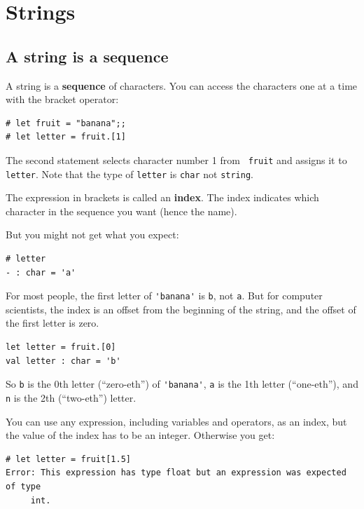 \documentclass[10pt]{book}
\begin{document}
\chapter{Strings}
\label{strings}


\section{A string is a sequence}

A string is a {\bf sequence} of characters.  
You can access the characters one at a time with the
bracket operator:

\beforeverb
\begin{verbatim}
# let fruit = "banana";;
# let letter = fruit.[1]
\end{verbatim}
\afterverb
%
The second statement selects character number 1 from {\tt
fruit} and assigns it to {\tt letter}. Note that the type 
of {\tt letter} is {\tt char} not {\tt string}.


The expression in brackets is called an {\bf index}.  
The index indicates which character in the sequence you
want (hence the name).

But you might not get what you expect:

\beforeverb
\begin{verbatim}
# letter
- : char = 'a'
\end{verbatim}
\afterverb
%
For most people, the first letter of \verb"'banana'" is {\tt b}, not
{\tt a}.  But for computer scientists, the index is an offset from the
beginning of the string, and the offset of the first letter is zero.

\beforeverb
\begin{verbatim}
let letter = fruit.[0]
val letter : char = 'b'
\end{verbatim}
\afterverb
%
So {\tt b} is the 0th letter (``zero-eth'') of \verb"'banana'", {\tt a}
is the 1th letter (``one-eth''), and {\tt n} is the 2th (``two-eth'')
letter.


You can use any expression, including variables and operators, as an
index, but the value of the index has to be an integer.  Otherwise you
get:


\beforeverb
\begin{verbatim}
# let letter = fruit[1.5]
Error: This expression has type float but an expression was expected of type
	 int.
\end{verbatim}
\afterverb
%
\end{document}
